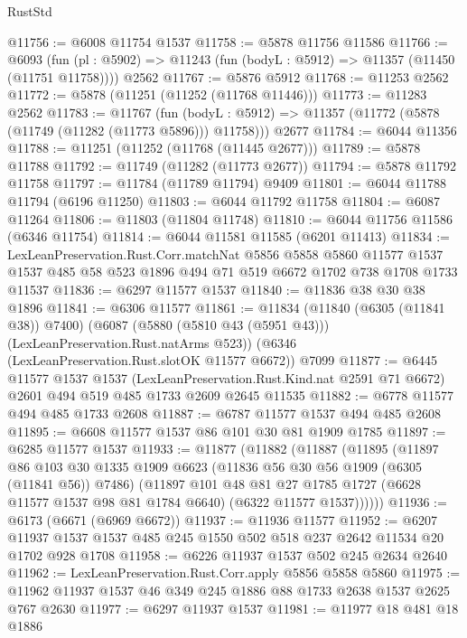 \begin{lexlean}{RustStd}
\begin{coremodule}
@11756 := @6008 @11754 @1537
@11758 := @5878 @11756 @11586
@11766 := @6093
    (fun (pl : @5902) => @11243 (fun (bodyL : @5912) => @11357 (@11450 (@11751 @11758))))
    @2562
@11767 := @5876 @5912
@11768 := @11253 @2562
@11772 := @5878 (@11251 (@11252 (@11768 @11446)))
@11773 := @11283 @2562
@11783 := @11767
    (fun (bodyL : @5912) => @11357 (@11772 (@5878 (@11749 (@11282 (@11773 @5896))) @11758)))
    @2677
@11784 := @6044 @11356
@11788 := @11251 (@11252 (@11768 (@11445 @2677)))
@11789 := @5878 @11788
@11792 := @11749 (@11282 (@11773 @2677))
@11794 := @5878 @11792 @11758
@11797 := @11784 (@11789 @11794) @9409
@11801 := @6044 @11788 @11794 (@6196 @11250)
@11803 := @6044 @11792 @11758
@11804 := @6087 @11264
@11806 := @11803 (@11804 @11748)
@11810 := @6044 @11756 @11586 (@6346 @11754)
@11814 := @6044 @11581 @11585 (@6201 @11413)
@11834 := LexLeanPreservation.Rust.Corr.matchNat
    @5856
    @5858
    @5860
    @11577
    @1537
    @1537
    @485
    @58
    @523
    @1896
    @494
    @71
    @519
    @6672
    @1702
    @738
    @1708
    @1733
    @11537
@11836 := @6297 @11577 @1537
@11840 := @11836 @38 @30 @38 @1896
@11841 := @6306 @11577
@11861 := @11834
    (@11840 (@6305 (@11841 @38)) @7400)
    (@6087 (@5880 (@5810 @43 (@5951 @43))) (LexLeanPreservation.Rust.natArms @523))
    (@6346 (LexLeanPreservation.Rust.slotOK @11577 @6672))
    @7099
@11877 := @6445
    @11577
    @1537
    @1537
    (LexLeanPreservation.Rust.Kind.nat @2591 @71 @6672)
    @2601
    @494
    @519
    @485
    @1733
    @2609
    @2645
    @11535
@11882 := @6778 @11577 @494 @485 @1733 @2608
@11887 := @6787 @11577 @1537 @494 @485 @2608
@11895 := @6608 @11577 @1537 @86 @101 @30 @81 @1909 @1785
@11897 := @6285 @11577 @1537
@11933 := @11877
    (@11882
      (@11887
        (@11895
          (@11897
            @86
            @103
            @30
            @1335
            @1909
            @6623
            (@11836 @56 @30 @56 @1909 (@6305 (@11841 @56)) @7486)
            (@11897
              @101
              @48
              @81
              @27
              @1785
              @1727
              (@6628 @11577 @1537 @98 @81 @1784 @6640)
              (@6322 @11577 @1537))))))
@11936 := @6173 (@6671 (@6969 @6672))
@11937 := @11936 @11577
@11952 := @6207 @11937 @1537 @1537 @485 @245 @1550 @502 @518 @237 @2642 @11534 @20 @1702 @928 @1708
@11958 := @6226 @11937 @1537 @502 @245 @2634 @2640
@11962 := LexLeanPreservation.Rust.Corr.apply @5856 @5858 @5860
@11975 := @11962 @11937 @1537 @46 @349 @245 @1886 @88 @1733 @2638 @1537 @2625 @767 @2630
@11977 := @6297 @11937 @1537
@11981 := @11977 @18 @481 @18 @1886

\end{coremodule}
\end{lexlean}
